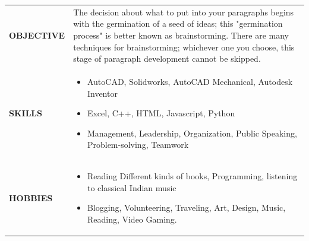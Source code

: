 \documentclass{article}
\begin{document}
{\begin{longtable}{ p{3.5cm}|p{13.5cm} }
{\textbf{\uppercase{Objective}}}&
\small{
The decision about what to put into your paragraphs begins with the germination of a seed of ideas; this "germination process" is better known as brainstorming. There are many techniques for brainstorming; whichever one you choose, this stage of paragraph development cannot be skipped.\newline}
\\
{\textbf{\uppercase{Skills}}}&
\small{
\begin{itemize}[noitemsep,nolistsep]
	\item AutoCAD, Solidworks, AutoCAD Mechanical, Autodesk Inventor
	\item Excel, C++, HTML, Javascript, Python
	\item Management, Leadership, Organization, Public Speaking, Problem-solving, Teamwork
\end{itemize}
}
\\
{\textbf{\uppercase{Hobbies}}}&
\small{
\begin{itemize}[noitemsep,nolistsep]
	\item Reading Different kinds of books, Programming, listening to classical Indian music
	\item Blogging, Volunteering, Traveling, Art, Design, Music, Reading, Video Gaming.
\end{itemize}

}
\end{longtable}}
\end{document}
